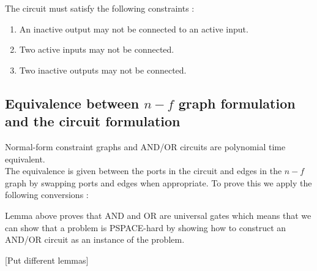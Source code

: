 The circuit must satisfy the following constraints : 
\begin{enumerate}
    \item An inactive output may not be connected to an active input.
    \item Two active inputs may not be connected.
    \item Two inactive outputs may not be connected. 
\end{enumerate}

\subsection{Equivalence between $n-f$ graph formulation and the circuit formulation}
\begin{lemma}
Normal-form constraint graphs and AND/OR circuits are polynomial time equivalent. \\ 
The equivalence is given between the ports in the circuit and edges in the $n-f$ graph by swapping ports and edges when appropriate. To prove this we apply the following conversions : \\ 
[Add drawings of edges and logic ports]
\end{lemma}

\begin{corollary}
Lemma above proves that AND and OR are universal gates which means that we can show that a problem is PSPACE-hard by showing how to construct an AND/OR circuit as an instance of the problem.
\end{corollary}
[Put different lemmas]